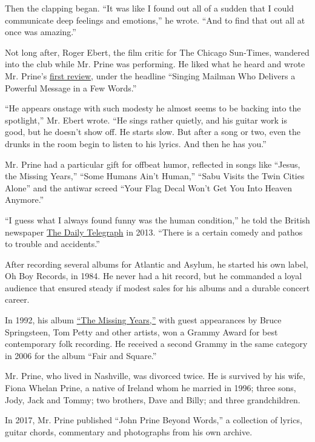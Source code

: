 Then the clapping began. ``It was like I found out all of a sudden that
I could communicate deep feelings and emotions,'' he wrote. ``And to
find that out all at once was amazing.''

Not long after, Roger Ebert, the film critic for The Chicago Sun-Times,
wandered into the club while Mr. Prine was performing. He liked what he
heard and wrote Mr. Prine's
\href{http://www.rogerebert.com/balder-and-dash/john-prine-american-legend}{first
review}, under the headline ``Singing Mailman Who Delivers a Powerful
Message in a Few Words.''

``He appears onstage with such modesty he almost seems to be backing
into the spotlight,'' Mr. Ebert wrote. ``He sings rather quietly, and
his guitar work is good, but he doesn't show off. He starts slow. But
after a song or two, even the drunks in the room begin to listen to his
lyrics. And then he has you.''

Mr. Prine had a particular gift for offbeat humor, reflected in songs
like ``Jesus, the Missing Years,'' ``Some Humans Ain't Human,'' ``Sabu
Visits the Twin Cities Alone'' and the antiwar screed ``Your Flag Decal
Won't Get You Into Heaven Anymore.''

``I guess what I always found funny was the human condition,'' he told
the British newspaper
\href{http://www.telegraph.co.uk/culture/music/rockandpopfeatures/9853440/John-Prine-I-find-the-human-condition-funny.html}{The
Daily Telegraph} in 2013. ``There is a certain comedy and pathos to
trouble and accidents.''

After recording several albums for Atlantic and Asylum, he started his
own label, Oh Boy Records, in 1984. He never had a hit record, but he
commanded a loyal audience that ensured steady if modest sales for his
albums and a durable concert career.

In 1992, his album
\href{https://www.youtube.com/watch?v=6jKopYJfjeQ\&list=OLAK5uy_lBOa4ysIPMfrphlG1IqSDyeubh6uwC-vk}{``The
Missing Years,''} with guest appearances by Bruce Springsteen, Tom Petty
and other artists, won a Grammy Award for best contemporary folk
recording. He received a second Grammy in the same category in 2006 for
the album ``Fair and Square.''

Mr. Prine, who lived in Nashville, was divorced twice. He is survived by
his wife, Fiona Whelan Prine, a native of Ireland whom he married in
1996; three sons, Jody, Jack and Tommy; two brothers, Dave and Billy;
and three grandchildren.

In 2017, Mr. Prine published ``John Prine Beyond Words,'' a collection
of lyrics, guitar chords, commentary and photographs from his own
archive.

